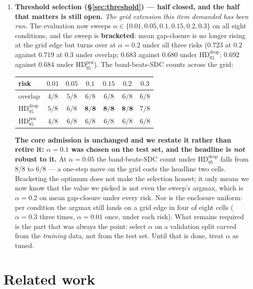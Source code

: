 \documentclass[11pt]{article}
\theoremstyle{remark}
\newcommand{\HDF}{\mathrm{HD}_{95}}
\begin{document}
\begin{enumerate}
\item \textbf{Threshold selection (\S\ref{sec:threshold}) --- half closed, and the
half that matters is still open.} \emph{The grid extension this item demanded has
been run.} The evaluation now sweeps
$\alpha\in\{0.01,0.05,0.1,0.15,0.2,0.3\}$ on all eight conditions, and the sweep is
\textbf{bracketed}: mean gap-closure is no longer rising at the grid edge but turns
over at $\alpha=0.2$ under all three risks ($0.723$ at $0.2$ against $0.719$ at
$0.3$ under overlap; $0.683$ against $0.680$ under $\HDF^{\mathrm{drop}}$; $0.692$
against $0.684$ under $\HDF^{\mathrm{pen}}$). The band-beats-SDC counts across the
grid:

\begin{center}
\small
\begin{tabular}{lcccccc}
\toprule
risk & $0.01$ & $0.05$ & $0.1$ & $0.15$ & $0.2$ & $0.3$ \\
\midrule
overlap                & $4/8$ & $5/8$ & $6/8$ & $6/8$ & $6/8$ & $6/8$ \\
$\HDF^{\mathrm{drop}}$ & $5/8$ & $6/8$ & $\mathbf{8/8}$ & $\mathbf{8/8}$ & $\mathbf{8/8}$ & $7/8$ \\
$\HDF^{\mathrm{pen}}$  & $4/8$ & $6/8$ & $6/8$ & $6/8$ & $6/8$ & $6/8$ \\
\bottomrule
\end{tabular}
\end{center}

\textbf{The core admission is unchanged and we restate it rather than retire it:
$\alpha=0.1$ was chosen on the test set, and the headline is \emph{not} robust to
it.} At $\alpha=0.05$ the band-beats-SDC count under $\HDF^{\mathrm{drop}}$ falls
from $8/8$ to $6/8$ --- a one-step move on the grid costs the headline two cells.
Bracketing the optimum does not make the selection honest; it only means we now know
that the value we picked is not even the sweep's argmax, which is $\alpha=0.2$ on
mean gap-closure under every risk. Nor is the enclosure uniform: per condition the
argmax still lands on a grid edge in four of eight cells ($\alpha=0.3$ three times,
$\alpha=0.01$ once, under each risk). What remains required is the part that was
always the point: select $\alpha$ on a validation split carved from the
\emph{training} data, not from the test set. Until that is done, treat $\alpha$ as
tuned.
\end{enumerate}

\section{Related work}
\end{document}

